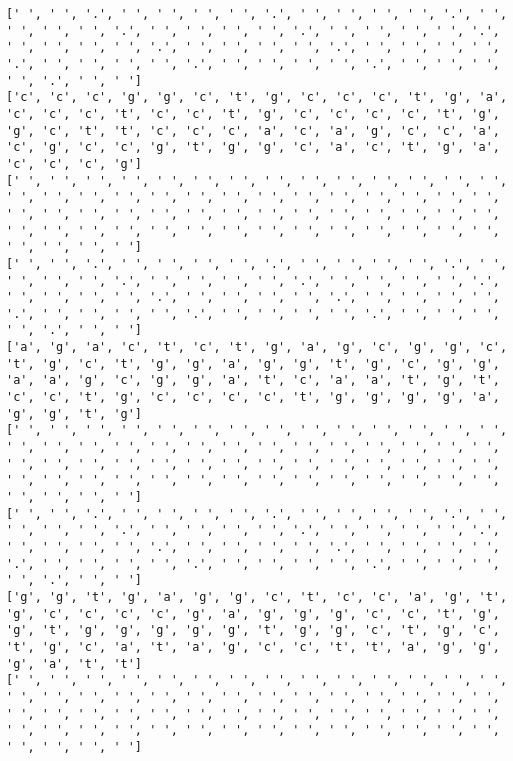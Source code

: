\documentclass{article}
\begin{document}
\begin{Verbatim}
[' ', ' ', '.', ' ', ' ', ' ', ' ', '.', ' ', ' ', ' ', ' ', '.', ' ', ' ', ' ', ' ', '.', ' ', ' ', ' ', ' ', '.', ' ', ' ', ' ', ' ', '.', ' ', ' ', ' ', ' ', '.', ' ', ' ', ' ', ' ', '.', ' ', ' ', ' ', ' ', '.', ' ', ' ', ' ', ' ', '.', ' ', ' ', ' ', ' ', '.', ' ', ' ', ' ', ' ', '.', ' ', ' ']
['c', 'c', 'c', 'g', 'g', 'c', 't', 'g', 'c', 'c', 'c', 't', 'g', 'a', 'c', 'c', 'c', 't', 'c', 'c', 't', 'g', 'c', 'c', 'c', 'c', 't', 'g', 'g', 'c', 't', 't', 'c', 'c', 'c', 'a', 'c', 'a', 'g', 'c', 'c', 'a', 'c', 'g', 'c', 'c', 'g', 't', 'g', 'g', 'c', 'a', 'c', 't', 'g', 'a', 'c', 'c', 'c', 'g']
[' ', ' ', ' ', ' ', ' ', ' ', ' ', ' ', ' ', ' ', ' ', ' ', ' ', ' ', ' ', ' ', ' ', ' ', ' ', ' ', ' ', ' ', ' ', ' ', ' ', ' ', ' ', ' ', ' ', ' ', ' ', ' ', ' ', ' ', ' ', ' ', ' ', ' ', ' ', ' ', ' ', ' ', ' ', ' ', ' ', ' ', ' ', ' ', ' ', ' ', ' ', ' ', ' ', ' ', ' ', ' ', ' ', ' ', ' ', ' ']
[' ', ' ', '.', ' ', ' ', ' ', ' ', '.', ' ', ' ', ' ', ' ', '.', ' ', ' ', ' ', ' ', '.', ' ', ' ', ' ', ' ', '.', ' ', ' ', ' ', ' ', '.', ' ', ' ', ' ', ' ', '.', ' ', ' ', ' ', ' ', '.', ' ', ' ', ' ', ' ', '.', ' ', ' ', ' ', ' ', '.', ' ', ' ', ' ', ' ', '.', ' ', ' ', ' ', ' ', '.', ' ', ' ']
['a', 'g', 'a', 'c', 't', 'c', 't', 'g', 'a', 'g', 'c', 'g', 'g', 'c', 't', 'g', 'c', 't', 'g', 'g', 'a', 'g', 'g', 't', 'g', 'c', 'g', 'g', 'a', 'a', 'g', 'c', 'g', 'g', 'a', 't', 'c', 'a', 'a', 't', 'g', 't', 'c', 'c', 't', 'g', 'c', 'c', 'c', 'c', 't', 'g', 'g', 'g', 'g', 'a', 'g', 'g', 't', 'g']
[' ', ' ', ' ', ' ', ' ', ' ', ' ', ' ', ' ', ' ', ' ', ' ', ' ', ' ', ' ', ' ', ' ', ' ', ' ', ' ', ' ', ' ', ' ', ' ', ' ', ' ', ' ', ' ', ' ', ' ', ' ', ' ', ' ', ' ', ' ', ' ', ' ', ' ', ' ', ' ', ' ', ' ', ' ', ' ', ' ', ' ', ' ', ' ', ' ', ' ', ' ', ' ', ' ', ' ', ' ', ' ', ' ', ' ', ' ', ' ']
[' ', ' ', '.', ' ', ' ', ' ', ' ', '.', ' ', ' ', ' ', ' ', '.', ' ', ' ', ' ', ' ', '.', ' ', ' ', ' ', ' ', '.', ' ', ' ', ' ', ' ', '.', ' ', ' ', ' ', ' ', '.', ' ', ' ', ' ', ' ', '.', ' ', ' ', ' ', ' ', '.', ' ', ' ', ' ', ' ', '.', ' ', ' ', ' ', ' ', '.', ' ', ' ', ' ', ' ', '.', ' ', ' ']
['g', 'g', 't', 'g', 'a', 'g', 'g', 'c', 't', 'c', 'c', 'a', 'g', 't', 'g', 'c', 'c', 'c', 'c', 'g', 'a', 'g', 'g', 'g', 'c', 'c', 't', 'g', 'g', 't', 'g', 'g', 'g', 'g', 'g', 't', 'g', 'g', 'c', 't', 'g', 'c', 't', 'g', 'c', 'a', 't', 'a', 'g', 'c', 'c', 't', 't', 'a', 'g', 'g', 'g', 'a', 't', 't']
[' ', ' ', ' ', ' ', ' ', ' ', ' ', ' ', ' ', ' ', ' ', ' ', ' ', ' ', ' ', ' ', ' ', ' ', ' ', ' ', ' ', ' ', ' ', ' ', ' ', ' ', ' ', ' ', ' ', ' ', ' ', ' ', ' ', ' ', ' ', ' ', ' ', ' ', ' ', ' ', ' ', ' ', ' ', ' ', ' ', ' ', ' ', ' ', ' ', ' ', ' ', ' ', ' ', ' ', ' ', ' ', ' ', ' ', ' ', ' ']

\end{Verbatim}
\end{document}
